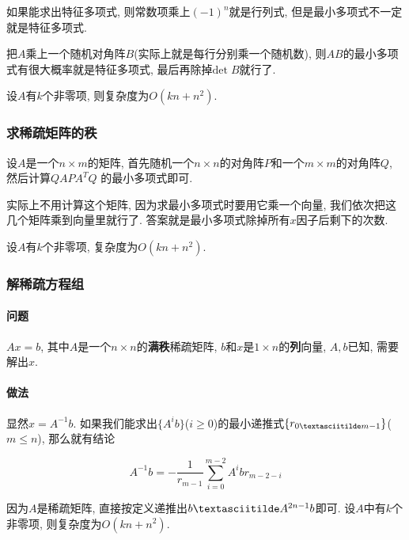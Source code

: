 	如果能求出特征多项式, 则常数项乘上$(-1)^n$就是行列式, 但是最小多项式不一定就是特征多项式.

	把$A$乘上一个随机对角阵$B$(实际上就是每行分别乘一个随机数), 则$AB$的最小多项式有很大概率就是特征多项式, 最后再除掉$\text{det}\;B$就行了.

	设$A$有$k$个非零项, 则复杂度为$O(kn + n ^ 2)$.

\subsubsection{求稀疏矩阵的秩}

	设$A$是一个$n\times m$的矩阵, 首先随机一个$n\times n$的对角阵$P$和一个$m\times m$的对角阵$Q$, 然后计算$Q A P A^T Q$ 的最小多项式即可.

	实际上不用计算这个矩阵, 因为求最小多项式时要用它乘一个向量, 我们依次把这几个矩阵乘到向量里就行了. 答案就是最小多项式除掉所有$x$因子后剩下的次数.

	设$A$有$k$个非零项, 复杂度为$O(kn + n ^ 2)$.

\subsubsection{解稀疏方程组}

	\paragraph{问题} $Ax = b$, 其中$A$是一个$n \times n$的\textbf{满秩}稀疏矩阵, $b$和$x$是$1\times n$的\textbf{列}向量, $A, b$已知, 需要解出$x$.

	\paragraph{做法} 显然$x = A^{-1} b$. 如果我们能求出$\{A^i b\}$($i \ge 0$)的最小递推式$\{r_{0 \textasciitilde m - 1}\}$($m \le n$), 那么就有结论

	$$ A^{-1} b = -\frac 1 {r_{m - 1}} \sum_{i = 0} ^ {m - 2} A^i b r_{m - 2 - i} $$

	因为$A$是稀疏矩阵, 直接按定义递推出$b \textasciitilde A^{2n - 1} b$即可. 设$A$中有$k$个非零项, 则复杂度为$O(kn + n^2)$.
	
	\inputminted{cpp}{../src/math/解稀疏方程组.cpp}